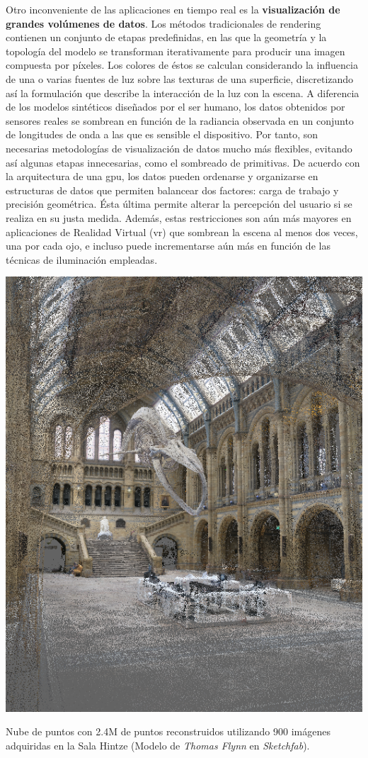 Otro inconveniente de las aplicaciones en tiempo real es la \textbf{visualización de grandes volúmenes de datos}. Los métodos tradicionales de rendering contienen un conjunto de etapas predefinidas, en las que la geometría y la topología del modelo se transforman iterativamente para producir una imagen compuesta por píxeles. Los colores de éstos se calculan considerando la influencia de una o varias fuentes de luz sobre las texturas de una superficie, discretizando así la formulación que describe la interacción de la luz con la escena. A diferencia de los modelos sintéticos diseñados por el ser humano, los datos obtenidos por sensores reales se sombrean en función de la radiancia observada en un conjunto de longitudes de onda a las que es sensible el dispositivo. Por tanto, son necesarias metodologías de visualización de datos mucho más flexibles, evitando así algunas etapas innecesarias, como el sombreado de primitivas. De acuerdo con la arquitectura de una \acrshort{gpu}, los datos pueden ordenarse y organizarse en estructuras de datos que permiten balancear dos factores: carga de trabajo y precisión geométrica. Ésta última permite alterar la percepción del usuario si se realiza en su justa medida. Además, estas restricciones son aún más mayores en aplicaciones de Realidad Virtual (\acrshort{vr}) que sombrean la escena al menos dos veces, una por cada ojo, e incluso puede incrementarse aún más en función de las técnicas de iluminación empleadas.
\begin{marginfigure}[-7.5cm]
	\includegraphics{figs/introduction/hintze.png}
	\caption{Nube de puntos con 2.4M de puntos reconstruidos utilizando 900 imágenes adquiridas en la Sala Hintze (Modelo de \textit{Thomas Flynn} en \textit{Sketchfab}).  }
	\label{fig:hintze_hall_spanish}
\end{marginfigure}

